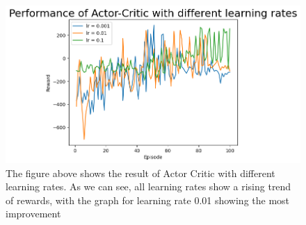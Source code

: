\documentclass{article}
\begin{document}
\begin{figure}[htbp]
\centering
\includegraphics[width=1.0\linewidth]{Report/images/actor_critic_no_bs.png}
\caption{\label{fig:ActorCritic for different learning rates}The figure above shows the result of Actor Critic with different learning rates. As we can see, all learning rates show a rising trend of rewards, with the graph for learning rate 0.01 showing the most improvement}
\end{figure}
\end{document}

